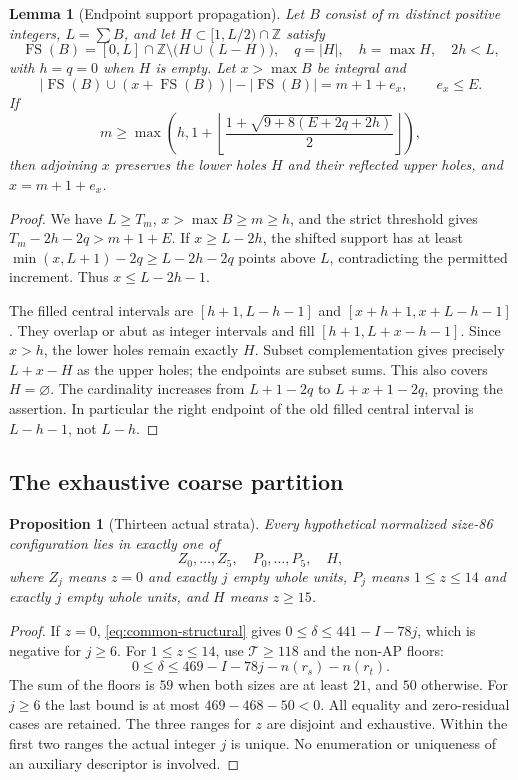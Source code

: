 \documentclass[11pt,letterpaper]{article}
\newcommand{\FS}{\operatorname{FS}}
\newcommand{\Z}{\mathbb Z}\newcommand{\R}{\mathbb R}
\newcommand{\card}[1]{\lvert#1\rvert}
\newtheorem{lemma}[theorem]{Lemma}
\newtheorem{proposition}[theorem]{Proposition}
\theoremstyle{definition}\newtheorem{definition}[theorem]{Definition}
\begin{document}
\begin{lemma}[Endpoint support propagation]\label{lem:common-endpoint-bridge}
Let $B$ consist of $m$ distinct positive integers, $L=\sum B$, and let $H\subset[1,L/2)\cap\Z$ satisfy
\[
\FS(B)=[0,L]\cap\Z\setminus\bigl(H\cup(L-H)\bigr),
\quad q=\card H,\quad h=\max H,\quad2h<L,
\]
with $h=q=0$ when $H$ is empty. Let $x>\max B$ be integral and
\[
\card{\FS(B)\cup(x+\FS(B))}-\card{\FS(B)}=m+1+e_x,
\qquad e_x\le E.
\]
If
\[
m\ge\max\left(h,1+\left\lfloor
\frac{1+\sqrt{9+8(E+2q+2h)}}2\right\rfloor\right),
\]
then adjoining $x$ preserves the lower holes $H$ and their reflected
upper holes, and $x=m+1+e_x$.
\end{lemma}
\begin{proof}
We have $L\ge T_m$, $x>\max B\ge m\ge h$, and the strict threshold
gives $T_m-2h-2q>m+1+E$. If $x\ge L-2h$, the shifted support has
at least $\min(x,L+1)-2q\ge L-2h-2q$ points above $L$, contradicting
the permitted increment. Thus $x\le L-2h-1$.

The filled central intervals are
$[h+1,L-h-1]$ and $[x+h+1,x+L-h-1]$. They overlap or abut as
integer intervals and fill $[h+1,L+x-h-1]$. Since $x>h$, the lower
holes remain exactly $H$. Subset complementation gives precisely
$L+x-H$ as the upper holes; the endpoints are subset sums. This also
covers $H=\varnothing$. The cardinality increases from $L+1-2q$
to $L+x+1-2q$, proving the assertion. In particular the right endpoint
of the old filled central interval is $L-h-1$, not $L-h$.
\end{proof}

\subsection{The exhaustive coarse partition}
\begin{proposition}[Thirteen actual strata]\label{prop:common-partition}
Every hypothetical normalized size-86 configuration lies in exactly
one of
\[
Z_0,\ldots,Z_5,\quad P_0,\ldots,P_5,\quad H,
\]
where $Z_j$ means $z=0$ and exactly $j$ empty whole units,
$P_j$ means $1\le z\le14$ and exactly $j$ empty whole units,
and $H$ means $z\ge15$.
\end{proposition}
\begin{proof}
If $z=0$, \eqref{eq:common-structural} gives
$0\le\delta\le441-I-78j$, which is negative for $j\ge6$.
For $1\le z\le14$, use $\mathcal T\ge118$ and the non-AP floors:
\[
0\le\delta\le469-I-78j-n(r_s)-n(r_t).
\]
The sum of the floors is $59$ when both sizes are at least $21$, and
$50$ otherwise. For $j\ge6$ the last bound is at most
$469-468-50<0$. All equality and zero-residual cases are retained.
The three ranges for $z$ are disjoint and exhaustive. Within the first
two ranges the actual integer $j$ is unique. No enumeration or
uniqueness of an auxiliary descriptor is involved.
\end{proof}
\end{document}
